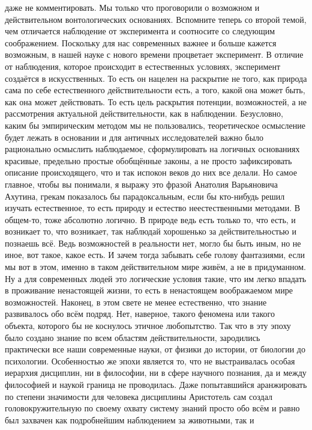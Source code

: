 даже не комментировать. Мы только что проговорили о возможном и действительном
вонтологических основаниях. Вспомните теперь со второй темой, чем отличается
наблюдение от эксперимента и соотносите со следующим соображением. Поскольку для
нас современных важнее и больше кажется возможным, в нашей науке с нового
времени процветает эксперимент. В отличие от наблюдения, которое происходит в
естественных условиях, эксперимент создаётся в искусственных. То есть он нацелен
на раскрытие не того, как природа сама по себе естественного действительности
есть, а того, какой она может быть, как она может действовать. То есть цель
раскрытия потенции, возможностей, а не рассмотрения актуальной действительности,
как в наблюдении. Безусловно, каким бы эмпирическим методом мы не пользовались,
теоретическое осмысление будет лежать в основании и для античных исследователей
важно было рационально осмыслить наблюдаемое, сформулировать на логичных
основаниях красивые, предельно простые обобщённые законы, а не просто
зафиксировать описание происходящего, что и так испокон веков до них все делали.
Но самое главное, чтобы вы понимали, я выражу это фразой Анатолия Варьяновича
Ахутина, грекам показалось бы парадоксальным, если бы кто-нибудь решил изучать
естественное, то есть природу и естество неестественными методами. В общем-то,
тоже абсолютно логично. В природе ведь есть только то, что есть, и возникает то,
что возникает, так наблюдай хорошенько за действительностью и познаешь всё. Ведь
возможностей в реальности нет, могло бы быть иным, но не иное, вот такое, какое
есть. И зачем тогда забывать себе голову фантазиями, если мы вот в этом, именно
в таком действительном мире живём, а не в придуманном. Ну а для современных
людей это логические условия такие, что им легко впадать в проживание
ненастоящей жизни, то есть в ненастоящем воображаемом мире возможностей.
Наконец, в этом свете не менее естественно, что знание развивалось обо всём
подряд. Нет, наверное, такого феномена или такого объекта, которого бы не
коснулось этичное любопытство. Так что в эту эпоху было создано знание по всем
областям действительности, зародились практически все наши современные науки, от
физики до истории, от биологии до психологии. Особенностью же эпохи является то,
что не выстраивалась особая иерархия дисциплин, ни в философии, ни в сфере
научного познания, да и между философией и наукой граница не проводилась. Даже
попытавшийся аранжировать по степени значимости для человека дисциплины
Аристотель сам создал головокружительную по своему охвату систему знаний просто
обо всём и равно был захвачен как подробнейшим наблюдением за животными, так и

